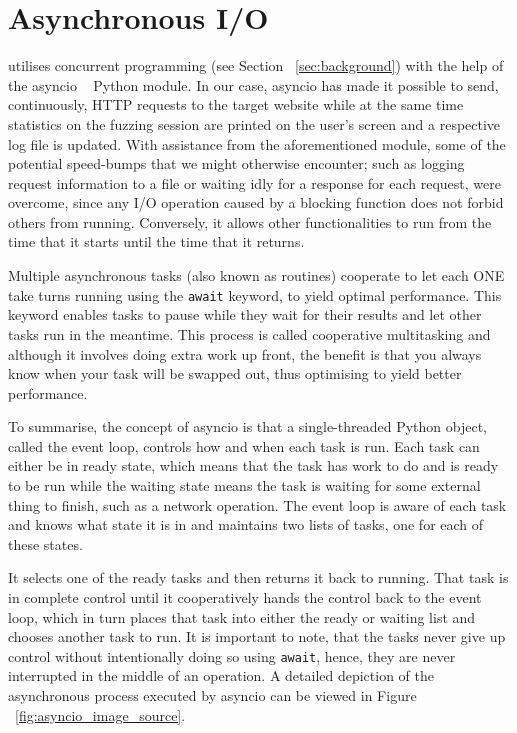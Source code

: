 \section{Asynchronous I/O}
\pname{} utilises concurrent programming (see Section ~\ref{sec:background}) with the help of the asyncio ~\cite{asyncio} Python module. In our case, asyncio has made it possible to send, continuously, HTTP requests to the target website while at the same time statistics on the fuzzing session are printed on the user's screen and a respective log file is updated. With assistance from the aforementioned module, some of the potential speed-bumps that we might otherwise encounter; such as logging request information to a file or waiting idly for a response for each request, were overcome, since any I/O operation caused by a blocking function does not forbid others from running. Conversely, it allows other functionalities to run from the time that it starts until the time that it returns. 

Multiple asynchronous tasks (also known as routines) cooperate to let each ONE take turns running using the {\tt await} keyword, to yield optimal performance. This keyword enables tasks to pause while they wait for their results and let other tasks run in the meantime. This process is called cooperative multitasking and although it involves doing extra work up front, the benefit is that you always know when your task will be swapped out, thus optimising to yield better performance.

To summarise, the concept of asyncio is that a single-threaded Python object, called the event loop, controls how and when each task is run. Each task can either be in ready state, which means that the task has work to do and is ready to be run while the waiting state means the task is waiting for some external thing to finish, such as a network operation. The event loop is aware of each task and knows what state it is in and maintains two lists of tasks, one for each of these states. 

It selects one of the ready tasks and then returns it back to running. That task is in complete control until it cooperatively hands the control back to the event loop, which in turn places that task into either the ready or waiting list and chooses another task to run. It is important to note, that the tasks never give up control without intentionally doing so using {\tt await}, hence, they are never interrupted in the middle of an operation. A detailed depiction of the asynchronous process executed by asyncio can be viewed in Figure ~\ref{fig:asyncio_image_source}.

